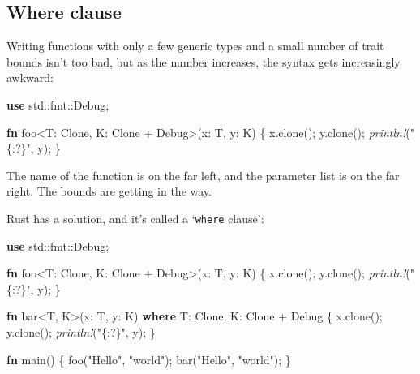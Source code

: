 \documentclass[a4paper,]{book}
\newenvironment{Shaded}{\begin{snugshade}}{\end{snugshade}}
\newcommand{\KeywordTok}[1]{\textcolor[rgb]{0.13,0.29,0.53}{\textbf{{#1}}}}
\newcommand{\StringTok}[1]{\textcolor[rgb]{0.31,0.60,0.02}{{#1}}}
\newcommand{\BuiltInTok}[1]{{#1}}
\newcommand{\PreprocessorTok}[1]{\textcolor[rgb]{0.56,0.35,0.01}{\textit{{#1}}}}
\newcommand{\NormalTok}[1]{{#1}}
\begin{document}
\subsection{Where clause}\label{where-clause}

Writing functions with only a few generic types and a small number of
trait bounds isn't too bad, but as the number increases, the syntax gets
increasingly awkward:

\begin{Shaded}
\begin{Highlighting}[]
\KeywordTok{use} \NormalTok{std::fmt::}\BuiltInTok{Debug}\NormalTok{;}

\KeywordTok{fn} \NormalTok{foo<T: }\BuiltInTok{Clone}\NormalTok{, K: }\BuiltInTok{Clone} \NormalTok{+ }\BuiltInTok{Debug}\NormalTok{>(x: T, y: K) \{}
    \NormalTok{x.clone();}
    \NormalTok{y.clone();}
    \PreprocessorTok{println!}\NormalTok{(}\StringTok{"\{:?\}"}\NormalTok{, y);}
\NormalTok{\}}
\end{Highlighting}
\end{Shaded}

The name of the function is on the far left, and the parameter list is
on the far right. The bounds are getting in the way.

Rust has a solution, and it's called a `\texttt{where} clause':

\begin{Shaded}
\begin{Highlighting}[]
\KeywordTok{use} \NormalTok{std::fmt::}\BuiltInTok{Debug}\NormalTok{;}

\KeywordTok{fn} \NormalTok{foo<T: }\BuiltInTok{Clone}\NormalTok{, K: }\BuiltInTok{Clone} \NormalTok{+ }\BuiltInTok{Debug}\NormalTok{>(x: T, y: K) \{}
    \NormalTok{x.clone();}
    \NormalTok{y.clone();}
    \PreprocessorTok{println!}\NormalTok{(}\StringTok{"\{:?\}"}\NormalTok{, y);}
\NormalTok{\}}

\KeywordTok{fn} \NormalTok{bar<T, K>(x: T, y: K) }\KeywordTok{where} \NormalTok{T: }\BuiltInTok{Clone}\NormalTok{, K: }\BuiltInTok{Clone} \NormalTok{+ }\BuiltInTok{Debug} \NormalTok{\{}
    \NormalTok{x.clone();}
    \NormalTok{y.clone();}
    \PreprocessorTok{println!}\NormalTok{(}\StringTok{"\{:?\}"}\NormalTok{, y);}
\NormalTok{\}}

\KeywordTok{fn} \NormalTok{main() \{}
    \NormalTok{foo(}\StringTok{"Hello"}\NormalTok{, }\StringTok{"world"}\NormalTok{);}
    \NormalTok{bar(}\StringTok{"Hello"}\NormalTok{, }\StringTok{"world"}\NormalTok{);}
\NormalTok{\}}
\end{Highlighting}
\end{Shaded}
\end{document}
